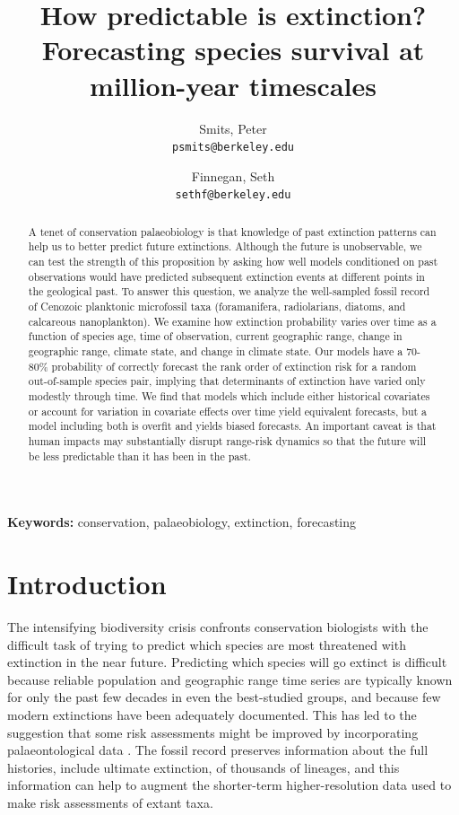 \documentclass[12pt,letterpaper]{article}
\title{How predictable is extinction? Forecasting species survival at million-year timescales}
\author{
 Smits, Peter\\
 \texttt{psmits@berkeley.edu} 
 \and
 Finnegan, Seth\\
 \texttt{sethf@berkeley.edu}
}
\date{}
\begin{document}
\begin{refsection}

\maketitle

\linenumbers{}
\modulolinenumbers[3]

\begin{abstract}
  A tenet of conservation palaeobiology is that knowledge of past extinction patterns can help us to better predict future extinctions. Although the future is unobservable, we can test the strength of this proposition by asking how well models conditioned on past observations would have predicted subsequent extinction events at different points in the geological past. To answer this question, we analyze the well-sampled fossil record of Cenozoic planktonic microfossil taxa (foramanifera, radiolarians, diatoms, and calcareous nanoplankton). We examine how extinction probability varies over time as a function of species age, time of observation, current geographic range, change in geographic range, climate state, and change in climate state. Our models have a 70-80\% probability of correctly forecast the rank order of extinction risk for a random out-of-sample species pair, implying that determinants of extinction have varied only modestly through time. We find that models which include either historical covariates or account for variation in covariate effects over time yield equivalent forecasts, but a model including both is overfit and yields biased forecasts. An important caveat is that human impacts may substantially disrupt range-risk dynamics so that the future will be less predictable than it has been in the past.

\end{abstract}

{\bf Keywords:} conservation, palaeobiology, extinction, forecasting



\section{Introduction}

The intensifying biodiversity crisis confronts conservation biologists with the difficult task of trying to predict which species are most threatened with extinction in the near future. Predicting which species will go extinct is difficult because reliable population and geographic range time series are typically known for only the past few decades in even the best-studied groups, and because few modern extinctions have been adequately documented. This has led to the suggestion that some risk assessments might be improved by incorporating palaeontological data \citep{Finnegan2015,Kiessling2016}. The fossil record preserves information about the full histories, include ultimate extinction, of thousands of lineages, and this information can help to augment the shorter-term higher-resolution data used to make risk assessments of extant taxa.


\end{refsection}
\end{document}
